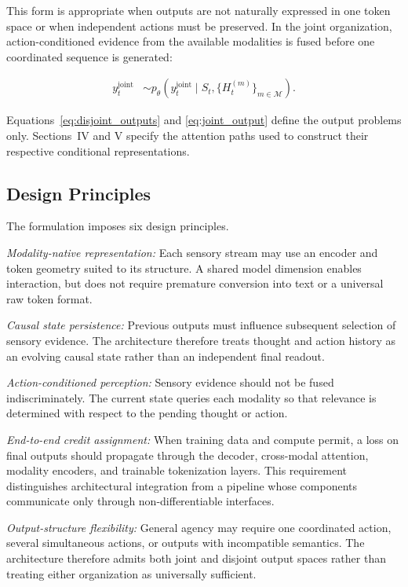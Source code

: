 This form is appropriate when outputs are not naturally expressed in one token space or when independent actions must be preserved. In the joint organization, action-conditioned evidence from the available modalities is fused before one coordinated sequence is generated:

\begin{equation}
\begin{aligned}
    y_t^{\mathrm{joint}}
    &\sim p_{\theta}\!\left(
       y_t^{\mathrm{joint}}
       \mid S_t,\{H_t^{(m)}\}_{m\in\mathcal{M}}
       \right).
\end{aligned}
\label{eq:joint_output}
\end{equation}

Equations~\eqref{eq:disjoint_outputs} and \eqref{eq:joint_output} define the output problems only. Sections~IV and V specify the attention paths used to construct their respective conditional representations.

\subsection{\textbf{Design Principles}}

The formulation imposes six design principles.

\textit{Modality-native representation:} Each sensory stream may use an encoder and token geometry suited to its structure. A shared model dimension enables interaction, but does not require premature conversion into text or a universal raw token format.

\textit{Causal state persistence:} Previous outputs must influence subsequent selection of sensory evidence. The architecture therefore treats thought and action history as an evolving causal state rather than an independent final readout.

\textit{Action-conditioned perception:} Sensory evidence should not be fused indiscriminately. The current state queries each modality so that relevance is determined with respect to the pending thought or action.

\textit{End-to-end credit assignment:} When training data and compute permit, a loss on final outputs should propagate through the decoder, cross-modal attention, modality encoders, and trainable tokenization layers. This requirement distinguishes architectural integration from a pipeline whose components communicate only through non-differentiable interfaces.

\textit{Output-structure flexibility:} General agency may require one coordinated action, several simultaneous actions, or outputs with incompatible semantics. The architecture therefore admits both joint and disjoint output spaces rather than treating either organization as universally sufficient.

